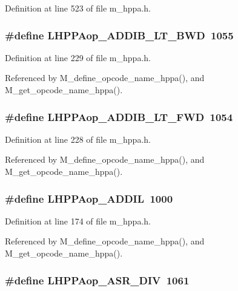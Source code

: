 Definition at line 523 of file m\_\-hppa.h.
\subsubsection{\setlength{\rightskip}{0pt plus 5cm}\#define LHPPAop\_\-ADDIB\_\-LT\_\-BWD~1055}\label{m__hppa_8h_638ea7a8058e0943bd3f4554f46ad9d2}




Definition at line 229 of file m\_\-hppa.h.

Referenced by M\_\-define\_\-opcode\_\-name\_\-hppa(), and M\_\-get\_\-opcode\_\-name\_\-hppa().
\subsubsection{\setlength{\rightskip}{0pt plus 5cm}\#define LHPPAop\_\-ADDIB\_\-LT\_\-FWD~1054}\label{m__hppa_8h_77bdd992b76b728215b3818cac61b35a}




Definition at line 228 of file m\_\-hppa.h.

Referenced by M\_\-define\_\-opcode\_\-name\_\-hppa(), and M\_\-get\_\-opcode\_\-name\_\-hppa().
\subsubsection{\setlength{\rightskip}{0pt plus 5cm}\#define LHPPAop\_\-ADDIL~1000}\label{m__hppa_8h_835ce13b18591983bf78fc38ded42b79}




Definition at line 174 of file m\_\-hppa.h.

Referenced by M\_\-define\_\-opcode\_\-name\_\-hppa(), and M\_\-get\_\-opcode\_\-name\_\-hppa().
\subsubsection{\setlength{\rightskip}{0pt plus 5cm}\#define LHPPAop\_\-ASR\_\-DIV~1061}\label{m__hppa_8h_9dd9a7888e04a649f9f599c7882a75a2}




